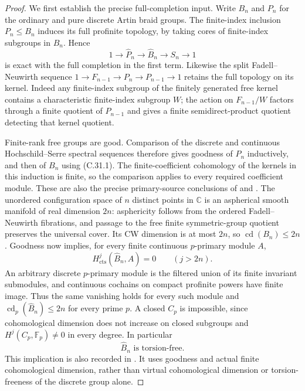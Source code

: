 \begin{proof}
We first establish the precise full-completion input. Write $B_n$ and
$P_n$ for the ordinary and pure discrete Artin braid groups. The
finite-index inclusion $P_n\leq B_n$ induces its full profinite
topology, by taking cores of finite-index subgroups in $B_n$. Hence
\[
 1\longrightarrow\widehat P_n\longrightarrow\widehat B_n
       \longrightarrow S_n\longrightarrow1                     \tag{C.31.1}
\]
is exact with the full completion in the first term. Likewise the
split Fadell--Neuwirth sequence
$1\to F_{n-1}\to P_n\to P_{n-1}\to1$ retains the full topology on
its kernel. Indeed any finite-index subgroup of the finitely
generated free kernel contains a characteristic finite-index subgroup
$W$; the action on $F_{n-1}/W$ factors through a finite quotient of
$P_{n-1}$ and gives a finite semidirect-product quotient detecting
that kernel quotient.

Finite-rank free groups are good. Comparison of the discrete and
continuous Hochschild--Serre spectral sequences therefore gives
goodness of $P_n$ inductively, and then of $B_n$ using (C.31.1).
The finite-coefficient cohomology of the kernels in this induction is
finite, so the comparison applies to every required coefficient
module. These are also the precise primary-source conclusions of
\cite[Proposition 5.10 and Corollary 5.11]{CEHorel2017} and
\cite[\S2.3, Proposition 1]{CEMarin2012}.
The unordered configuration space of $n$ distinct points in
$\mathbb C$ is an aspherical smooth manifold of real dimension $2n$:
asphericity follows from the ordered Fadell--Neuwirth fibrations,
and passage to the free finite symmetric-group quotient preserves
the universal cover. Its CW dimension is at most $2n$, so
$\operatorname{cd}(B_n)\leq2n$. Goodness now implies, for every
finite continuous $p$-primary module $A$,
\[
 H^j_{\mathrm{cts}}(\widehat B_n,A)=0\qquad(j>2n).
\]
An arbitrary discrete $p$-primary module is the filtered union of
its finite invariant submodules, and continuous cochains on compact
profinite powers have finite image. Thus the same vanishing holds
for every such module and
$\operatorname{cd}_p(\widehat B_n)\leq2n$ for every prime $p$.
A closed $C_p$ is impossible, since cohomological dimension does
not increase on closed subgroups and
$H^j(C_p,\mathbb F_p)\ne0$ in every degree. In particular
\[
                     \widehat B_n\text{ is torsion-free}.        \tag{C.31.2}
\]
This implication is also recorded in
\cite[Lemma 8.4]{CEMorales2024}. It uses goodness and actual finite
cohomological dimension, rather than virtual cohomological dimension
or torsion-freeness of the discrete group alone.


\end{proof}
